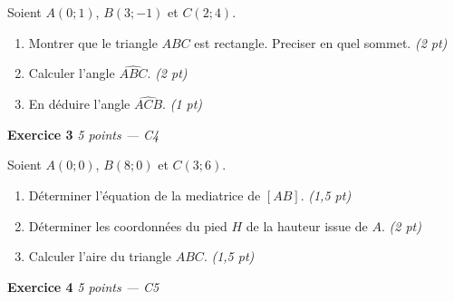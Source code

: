 Soient $A(0; 1)$, $B(3; -1)$ et $C(2; 4)$.

\begin{enumerate}
  \item Montrer que le triangle $ABC$ est rectangle. Preciser en quel sommet. \hfill \textit{(2 pt)}
  \item Calculer l'angle $\widehat{ABC}$. \hfill \textit{(2 pt)}
  \item En déduire l'angle $\widehat{ACB}$. \hfill \textit{(1 pt)}
\end{enumerate}


\bigskip

\textbf{Exercice 3} \hfill \textit{5 points — C4}

Soient $A(0; 0)$, $B(8; 0)$ et $C(3; 6)$.

\begin{enumerate}
  \item Déterminer l'équation de la mediatrice de $[AB]$. \hfill \textit{(1,5 pt)}
  \item Déterminer les coordonnées du pied $H$ de la hauteur issue de $A$. \hfill \textit{(2 pt)}
  \item Calculer l'aire du triangle $ABC$. \hfill \textit{(1,5 pt)}
\end{enumerate}


\bigskip

\textbf{Exercice 4} \hfill \textit{5 points — C5}

